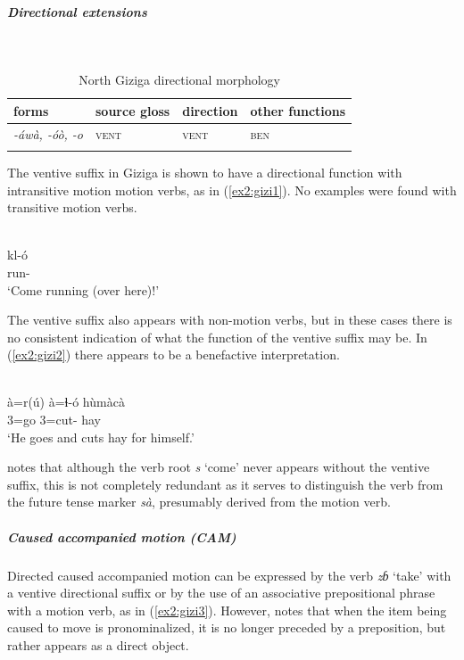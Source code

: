 \subparagraph{Directional extensions}~

\begin{table}[H]
	\caption{North Giziga directional morphology}
	\label{tab:gizi}
	\begin{tabular}{llll} %
		\lsptoprule
		forms & source gloss & direction  & other functions  \\ %
		\midrule
		\textit{-áwà, -óò, -o}  &  \textsc{vent}  &  \textsc{vent}  &  \textsc{ben}  \\
		\lspbottomrule
	\end{tabular}
\end{table} 

The ventive suffix in Giziga is shown to have a directional function with intransitive motion motion verbs, as in (\ref{ex2:gizi1}). No examples were found with transitive motion verbs. 

\ea\label{ex2:gizi1}
 \\
\gll kl-ó \\
run- \\
\glt `Come running (over here)!'
\z 

The ventive suffix also appears with non-motion verbs, but in these cases there is no consistent indication of what the function of the ventive suffix may be. In (\ref{ex2:gizi2}) there appears to be a benefactive interpretation. 

\ea\label{ex2:gizi2}
 \\
\gll à=r(ú) à=ɬ-ó hùmàcà \\
3=go 3=cut- hay \\
\glt `He goes and cuts hay for himself.'
\z 

\citet[203]{shayGrammarGizigaChadic2021} notes that although the verb root \textit{s} `come' never appears without the ventive suffix, this is not completely redundant as it serves to distinguish the verb from the future tense marker \textit{sà}, presumably derived from the motion verb. 

\subparagraph{Caused accompanied motion (CAM)}

Directed caused accompanied motion can be expressed by the verb \textit{zɓ} `take' with a ventive directional suffix or by the use of an associative prepositional phrase with a motion verb, as in (\ref{ex2:gizi3}). However, \citet[200]{shayGrammarGizigaChadic2021} notes that when the item being caused to move is pronominalized, it is no longer preceded by a preposition, but rather appears as a direct object. 

